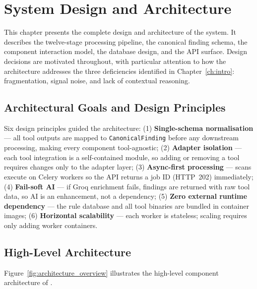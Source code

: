 \chapter{System Design and Architecture}
\label{ch:design}

This chapter presents the complete design and architecture of the \ACRQA{} system. It describes the twelve-stage processing pipeline, the canonical finding schema, the component interaction model, the database design, and the API surface. Design decisions are motivated throughout, with particular attention to how the architecture addresses the three deficiencies identified in Chapter~\ref{ch:intro}: fragmentation, signal noise, and lack of contextual reasoning.

\section{Architectural Goals and Design Principles}
\label{sec:arch_goals}

Six design principles guided the architecture: (1) \textbf{Single-schema normalisation} --- all tool outputs are mapped to \texttt{CanonicalFinding} before any downstream processing, making every component tool-agnostic; (2) \textbf{Adapter isolation} --- each tool integration is a self-contained module, so adding or removing a tool requires changes only to the adapter layer; (3) \textbf{Async-first processing} --- scans execute on Celery workers so the API returns a job ID (HTTP~202) immediately; (4) \textbf{Fail-soft AI} --- if Groq enrichment fails, findings are returned with raw tool data, so AI is an enhancement, not a dependency; (5) \textbf{Zero external runtime dependency} --- the rule database and all tool binaries are bundled in container images; (6) \textbf{Horizontal scalability} --- each worker is stateless; scaling requires only adding worker containers.

\section{High-Level Architecture}
\label{sec:high_level_arch}

Figure~\ref{fig:architecture_overview} illustrates the high-level component architecture of \ACRQA{}.

